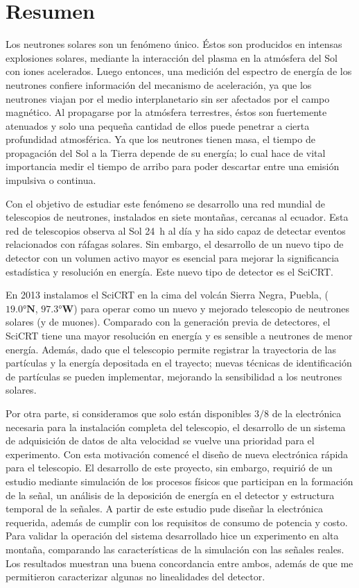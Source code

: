 
\pagestyle{empty}
\chapter{Resumen}

Los neutrones solares son un fenómeno único. Éstos son producidos en intensas explosiones solares, mediante la interacción del plasma en la atmósfera del Sol con iones acelerados. Luego entonces, una medición del espectro de energía de los neutrones confiere información del mecanismo de aceleración, ya que  los neutrones viajan por el medio interplanetario sin ser afectados por el campo magnético. Al propagarse por la atmósfera terrestres, éstos son fuertemente atenuados y solo una pequeña cantidad de ellos puede penetrar a cierta profundidad atmosférica. Ya que los neutrones tienen masa, el tiempo de propagación del Sol a la Tierra depende de su energía; lo cual hace de vital importancia medir el tiempo de arribo para poder descartar entre una emisión impulsiva o continua.

Con el objetivo de estudiar este fenómeno se desarrollo una red mundial de telescopios de neutrones, instalados en siete montañas, cercanas al ecuador. Esta red de telescopios observa al Sol \SI{24}{\hour} al día y ha sido capaz de detectar eventos relacionados con ráfagas solares. Sin embargo, el desarrollo de un nuevo tipo de detector con un volumen activo mayor es esencial para mejorar la significancia estadística y resolución en energía. Este nuevo tipo de detector es el SciCRT.

En \num{2013} instalamos el SciCRT en la cima del volcán Sierra Negra, Puebla, ($\ang{19.0}\mathbf{N}$, $\ang{97.3}\mathbf{W}$) para operar como un nuevo y mejorado telescopio de neutrones solares (y de muones). Comparado con la generación previa de detectores, el SciCRT tiene una mayor resolución en energía y es sensible a neutrones de menor energía. Además, dado que el telescopio permite registrar la trayectoria de las partículas y la energía depositada en el trayecto; nuevas técnicas de identificación de partículas se pueden implementar, mejorando la sensibilidad a los neutrones solares.

Por otra parte, si consideramos que solo están disponibles $3/8$ de la electrónica necesaria para la instalación completa del telescopio, el desarrollo de un sistema de adquisición de datos de alta velocidad se vuelve una prioridad para el experimento. Con esta motivación comencé el diseño de nueva electrónica rápida para el telescopio. El desarrollo de este proyecto, sin embargo, requirió de un estudio mediante simulación de los procesos físicos que participan en la formación de la señal, un análisis de la deposición de energía en el detector y estructura temporal de la señales. A partir de este estudio pude diseñar la electrónica requerida, además de cumplir con los requisitos de consumo de potencia y costo. Para validar la operación del sistema desarrollado hice un experimento en alta montaña, comparando las características de la simulación con las señales reales. Los resultados muestran una buena concordancia entre ambos, además de que me permitieron caracterizar algunas no linealidades del detector.

